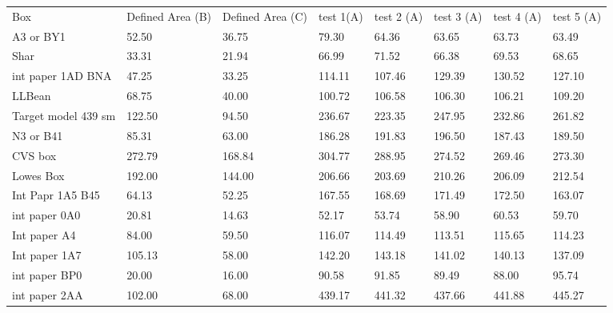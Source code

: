 \documentclass[11pt, twoside, reqno]{book}
\begin{document}
\begin{table}[]
	\centering
	
	\label{AR1B}
	\tiny
	\begin{tabular}{llllllll}
		Box                 & Defined Area (B) & Defined Area (C) & test 1(A) & test 2 (A) & test 3 (A) & test 4 (A) & test 5 (A) \\
		A3 or BY1           & 52.50            & 36.75            & 79.30     & 64.36      & 63.65      & 63.73      & 63.49      \\
		Shar                & 33.31            & 21.94            & 66.99     & 71.52      & 66.38      & 69.53      & 68.65      \\
		int paper 1AD BNA   & 47.25            & 33.25            & 114.11    & 107.46     & 129.39     & 130.52     & 127.10     \\
		LLBean              & 68.75            & 40.00            & 100.72    & 106.58     & 106.30     & 106.21     & 109.20     \\
		Target model 439 sm & 122.50           & 94.50            & 236.67    & 223.35     & 247.95     & 232.86     & 261.82     \\
		N3 or B41           & 85.31            & 63.00            & 186.28    & 191.83     & 196.50     & 187.43     & 189.50     \\
		CVS box             & 272.79           & 168.84           & 304.77    & 288.95     & 274.52     & 269.46     & 273.30     \\
		Lowes Box           & 192.00           & 144.00           & 206.66    & 203.69     & 210.26     & 206.09     & 212.54     \\
		Int Papr 1A5 B45    & 64.13            & 52.25            & 167.55    & 168.69     & 171.49     & 172.50     & 163.07     \\
		int paper 0A0       & 20.81            & 14.63            & 52.17     & 53.74      & 58.90      & 60.53      & 59.70      \\
		Int paper A4        & 84.00            & 59.50            & 116.07    & 114.49     & 113.51     & 115.65     & 114.23     \\
		Int paper 1A7       & 105.13           & 58.00            & 142.20    & 143.18     & 141.02     & 140.13     & 137.09     \\
		int paper BP0       & 20.00            & 16.00            & 90.58     & 91.85      & 89.49      & 88.00      & 95.74      \\
		int paper 2AA       & 102.00           & 68.00            & 439.17    & 441.32     & 437.66     & 441.88     & 445.27     \\

\end{tabular}
\end{table}
\end{document}
